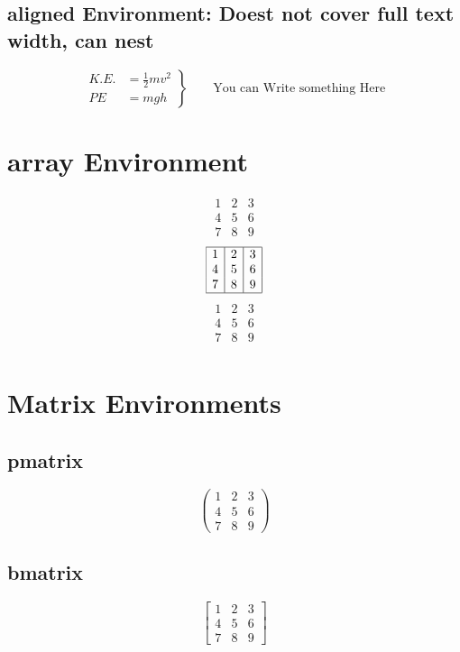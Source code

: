 \documentclass{article}
\begin{document}
	\subsection{aligned Environment: Doest not cover full text width, can nest}
	\begin{equation*}
		\left.\begin{aligned}
			K.E.&=\frac{1}{2}mv^2\\
			PE&=mgh
		\end{aligned}
		\right\}
		\qquad \text{You can Write something Here}
	\end{equation*}
	
	\section{array Environment}
	
	\[
	\begin{array}{ccc}
	1&2&3\\
	4&5&6\\
	7&8&9
	\end{array}
	\]
	\[
	\begin{array}{|c|c|c|}
	\hline
	1&2&3\\
	4&5&6\\
	7&8&9\\
	\hline
	\end{array}
	\]
	\[
	\begin{array}{c|c|c}
	
	1&2&3\\
	\hline
	4&5&6\\
	\hline
	7&8&9\\
	
	\end{array}
	\]
	\section{Matrix Environments}
	\subsection{pmatrix}
	\[
	\begin{pmatrix}
	1&2&3\\
	4&5&6\\
	7&8&9
	\end{pmatrix}
	\]
	
	\subsection{bmatrix}
	\[
	\begin{bmatrix}
	1&2&3\\
	4&5&6\\
	7&8&9
	\end{bmatrix}
	\]
\end{document}
